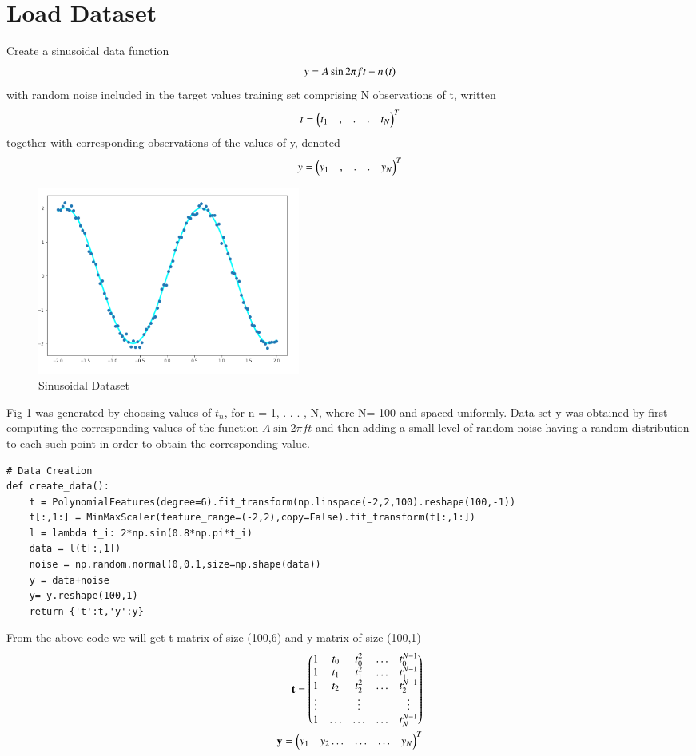 \documentclass[journal,12pt,twocolumn]{IEEEtran}
\begin{document}
\section{Load Dataset}
Create a sinusoidal data function
\begin{align}
    y = A\sin{2\pi{ft}}+n\left(t\right)
\end{align}
with random noise included in the target values training set comprising N observations of t,
written
\begin{align}
    t=\begin{pmatrix}t_1 &,&.&.& t_N\end{pmatrix}^T 
\end{align}
together with corresponding observations of the values
of y, denoted 
\begin{align}
    y=\begin{pmatrix}y_1 &,&.&.& y_N\end{pmatrix}^T
\end{align}
\begin{figure}[!h]
\begin{center}
\includegraphics[width=3.4in]{a1.png}
\end{center}
\caption{Sinusoidal Dataset}
\label{fig:1}
\end{figure}
Fig \ref{fig:1} was generated by choosing
values of $t_n$, for n = 1, . . . , N, where N= 100 and spaced uniformly. Data set y was obtained by first computing the corresponding values of the function $A\sin2\pi{ft}$ and then adding a small level of random noise having a random distribution to each such point in order to obtain the corresponding value.
\begin{lstlisting}
# Data Creation
def create_data():
    t = PolynomialFeatures(degree=6).fit_transform(np.linspace(-2,2,100).reshape(100,-1))
    t[:,1:] = MinMaxScaler(feature_range=(-2,2),copy=False).fit_transform(t[:,1:])
    l = lambda t_i: 2*np.sin(0.8*np.pi*t_i)
    data = l(t[:,1])
    noise = np.random.normal(0,0.1,size=np.shape(data))
    y = data+noise
    y= y.reshape(100,1)
    return {'t':t,'y':y}
\end{lstlisting}
From the above code we will get t matrix of size (100,6) and y matrix of size (100,1)
\begin{align}
\mathbf{t}= \begin{pmatrix} 1 & t_{0} & t_{0}^2 & \ldots & t_{0}^{N-1} \\
		1 & t_{1} & t_{1}^2 & \ldots & t_{1}^{N-1} \\
		1 & t_{2} & t_{2}^2 & \ldots & t_{2}^{N-1} \\
		\vdots & & \vdots &  & \vdots  \\
		    1 & \ldots & \ldots & \ldots & t_{N}^{N-1} \end{pmatrix}\label{eq:1}\\
\mathbf{y} =\begin{pmatrix}y_1 & y_2 \ldots & \ldots & \ldots & y_N\end{pmatrix}^T
\end{align}
\end{document}
